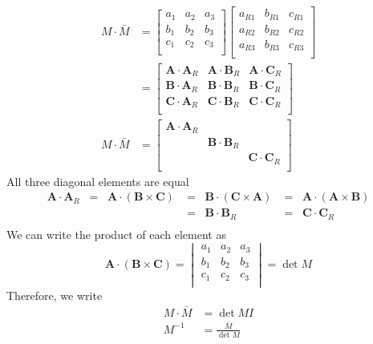 \documentclass[../main.tex]{subfiles}
\begin{document}
\begin{align*}
	M \cdot \bar{M }&=
	\begin{bmatrix}
		a_1&a_2&a_3\\
		b_1&b_2&b_3\\
		c_1&c_2&c_3\\
	\end{bmatrix}
	\begin{bmatrix}
		a_{R1}&b_{R1}&c_{R1}\\
		a_{R2}&b_{R2}&c_{R2}\\
		a_{R3}&b_{R3}&c_{R3}\\
	\end{bmatrix}
	\\
	&=
	\begin{bmatrix}
		\mathbf{A }\cdot \mathbf{A }_R&\mathbf{A }\cdot \mathbf{B}_R&\mathbf{A }\cdot \mathbf{C }_R\\
		\mathbf{B }\cdot \mathbf{A }_R&\mathbf{B }\cdot \mathbf{B}_R&\mathbf{B }\cdot \mathbf{C }_R\\
		\mathbf{C }\cdot \mathbf{A }_R&\mathbf{C }\cdot \mathbf{B}_R&\mathbf{C }\cdot \mathbf{C }_R\\
	\end{bmatrix}
	\\
	M \cdot \bar{M}&=
	\begin{bmatrix}
		\mathbf{A }\cdot \mathbf{A }_R&&\\
		&\mathbf{B }\cdot \mathbf{B}_R&\\
		&&\mathbf{C }\cdot \mathbf{C }_R\\
	\end{bmatrix}
\end{align*}
All three diagonal elements are equal
\begin{equation*}
	\begin{array}{rll}
		\mathbf{A } \cdot \mathbf{A }_R\;\;=\;\;\mathbf{A }\cdot \left( \mathbf{B }\times \mathbf{C } \right) & =\;\;\mathbf{B }\cdot \left( \mathbf{C }\times \mathbf{A } \right) &=\;\;\mathbf{A }\cdot \left( \mathbf{A }\times \mathbf{B } \right) \\
		&=\;\;\mathbf{B }\cdot \mathbf{B }_R &=\;\;\mathbf{C }\cdot \mathbf{C }_R\\
	\end{array}
\end{equation*}
We can write the product of each element as 
\begin{equation*}
	\mathbf{A }\cdot \left( \mathbf{B }\times \mathbf{C } \right) =
	\begin{vmatrix}
		a_1&a_2&a_3\\
		b_1&b_2&b_3\\
		c_1&c_2&c_3\\
	\end{vmatrix}
	=\det M
\end{equation*}
Therefore, we write 
\begin{align*}
	M \cdot \bar{M }&=\det M I\\
	M^{-1}&=\frac{\bar{M }}{\det M }
\end{align*}
\end{document}
